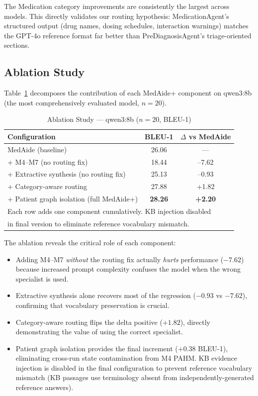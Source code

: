 \documentclass[conference]{IEEEtran}
\begin{document}
The Medication category improvements are consistently the largest across models.
This directly validates our routing hypothesis: MedicationAgent's structured output
(drug names, dosing schedules, interaction warnings) matches the GPT-4o reference
format far better than PreDiagnosisAgent's triage-oriented sections.

\subsection{Ablation Study}
\label{sec:ablation}

Table~\ref{tab:ablation} decomposes the contribution of each MedAide+ component
on qwen3:8b (the most comprehensively evaluated model, $n{=}20$).

\begin{table}[t]
\centering
\caption{Ablation Study — qwen3:8b ($n{=}20$, BLEU-1)}
\label{tab:ablation}
\setlength{\tabcolsep}{5pt}
\begin{tabular}{lcc}
\toprule
\textbf{Configuration} & \textbf{BLEU-1} & \textbf{$\Delta$ vs MedAide} \\
\midrule
MedAide (baseline)                        & 26.06 & — \\
+ M4–M7 (no routing fix)                  & 18.44 & --7.62 \\
+ Extractive synthesis (no routing fix)   & 25.13 & --0.93 \\
+ Category-aware routing                  & 27.88 & +1.82 \\
+ Patient graph isolation (full MedAide+) & \textbf{28.26} & \textbf{+2.20} \\
\bottomrule
\multicolumn{3}{l}{\scriptsize Each row adds one component cumulatively. KB injection disabled}\\
\multicolumn{3}{l}{\scriptsize in final version to eliminate reference vocabulary mismatch.}\\
\end{tabular}
\end{table}

The ablation reveals the critical role of each component:
\begin{itemize}
  \item Adding M4–M7 \emph{without} the routing fix actually \emph{hurts} performance
    ($-7.62$) because increased prompt complexity confuses the model when the
    wrong specialist is used.
  \item Extractive synthesis alone recovers most of the regression ($-0.93$ vs $-7.62$),
    confirming that vocabulary preservation is crucial.
  \item Category-aware routing flips the delta positive ($+1.82$), directly
    demonstrating the value of using the correct specialist.
  \item Patient graph isolation provides the final increment ($+0.38$ BLEU-1),
    eliminating cross-run state contamination from M4 PAHM. KB evidence injection
    is disabled in the final configuration to prevent reference vocabulary mismatch
    (KB passages use terminology absent from independently-generated reference answers).
\end{itemize}
\end{document}
